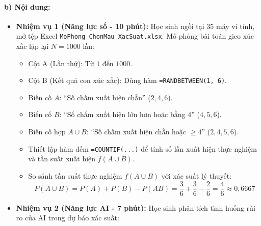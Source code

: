 \documentclass[12pt, a4paper]{article}
\begin{document}
\paragraph{b) Nội dung:}
\begin{itemize}[leftmargin=0.6cm]
    \item \textbf{Nhiệm vụ 1 (Năng lực số - 10 phút):} Học sinh ngồi tại 35 máy vi tính, mở tệp Excel \texttt{MoPhong\_ChonMau\_XacSuat.xlsx}.
    Mô phỏng bài toán gieo xúc xắc lặp lại $N = 1000$ lần:
    \begin{itemize}[leftmargin=0.4cm]
        \item Cột A (Lần thử): Từ $1$ đến $1000$.
        \item Cột B (Kết quả con xúc xắc): Dùng hàm \texttt{=RANDBETWEEN(1, 6)}.
        \item Biến cố $A$: ``Số chấm xuất hiện chẵn'' ($2, 4, 6$).
        \item Biến cố $B$: ``Số chấm xuất hiện lớn hơn hoặc bằng 4'' ($4, 5, 6$).
        \item Biến cố hợp $A \cup B$: ``Số chấm xuất hiện chẵn hoặc $\geq 4$'' ($2, 4, 5, 6$).
        \item Thiết lập hàm đếm \texttt{=COUNTIF(...)} để tính số lần xuất hiện thực nghiệm và tần suất xuất hiện $f(A \cup B)$.
        \item So sánh tần suất thực nghiệm $f(A \cup B)$ với xác suất lý thuyết:
        $$P(A \cup B) = P(A) + P(B) - P(AB) = \dfrac{3}{6} + \dfrac{3}{6} - \dfrac{2}{6} = \dfrac{4}{6} \approx 0{,}6667$$
    \end{itemize}

    \item \textbf{Nhiệm vụ 2 (Năng lực AI - 7 phút):} Học sinh phân tích tình huống rủi ro của AI trong dự báo xác suất:
\end{itemize}
\end{document}
